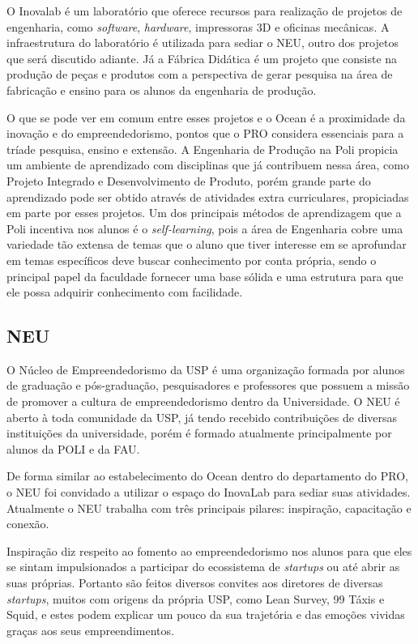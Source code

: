 O Inovalab é um laboratório que oferece recursos para realização de projetos de engenharia, como \textit{software}, \textit{hardware}, impressoras 3D e oficinas mecânicas. A infraestrutura do laboratório é utilizada para sediar o NEU, outro dos projetos que será discutido adiante. Já a Fábrica Didática é um projeto que consiste na produção de peças e produtos com a perspectiva de gerar pesquisa na área de fabricação e ensino para os alunos da engenharia de produção.

O que se pode ver em comum entre esses projetos e o Ocean é a proximidade da inovação e do empreendedorismo, pontos que o PRO considera essenciais para a tríade pesquisa, ensino e extensão. A Engenharia de Produção na Poli propicia um ambiente de aprendizado com disciplinas que já contribuem nessa área, como Projeto Integrado e Desenvolvimento de Produto, porém grande parte do aprendizado pode ser obtido através de atividades extra curriculares, propiciadas em parte por esses projetos. Um dos principais métodos de aprendizagem que a Poli incentiva nos alunos é o \textit{self-learning}, pois a área de Engenharia cobre uma variedade tão extensa de temas que o aluno que tiver interesse em se aprofundar em temas específicos deve buscar conhecimento por conta própria, sendo o principal papel da faculdade fornecer uma base sólida e uma estrutura para que ele possa adquirir conhecimento com facilidade.

\subsection{NEU}
\label{sec:con_neu}

O Núcleo de Empreendedorismo da USP é uma organização formada por alunos de graduação e pós-graduação, pesquisadores e professores que possuem a missão de promover a cultura de empreendedorismo dentro da Universidade. O NEU é aberto à toda comunidade da USP, já tendo recebido contribuições de diversas instituições da universidade, porém é formado atualmente principalmente por alunos da POLI e da FAU.

De forma similar ao estabelecimento do Ocean dentro do departamento do PRO, o NEU foi convidado a utilizar o espaço do InovaLab para sediar suas atividades. Atualmente o NEU trabalha com três principais pilares: inspiração, capacitação e conexão.

Inspiração diz respeito ao fomento ao empreendedorismo nos alunos para que eles se sintam impulsionados a participar do ecossistema de \textit{startups} ou até abrir as suas próprias. Portanto são feitos diversos convites aos diretores de diversas \textit{startups}, muitos com origens da própria USP, como Lean Survey, 99 Táxis e Squid, e estes podem explicar um pouco da sua trajetória e das emoções vividas graças aos seus empreendimentos. 

